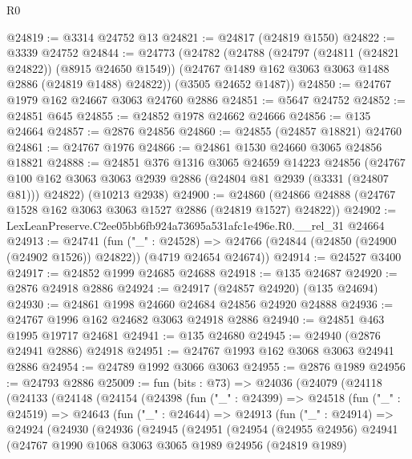 \begin{lexlean}{R0}
\begin{coremodule}
@24819 := @3314 @24752 @13
@24821 := @24817 (@24819 @1550)
@24822 := @3339 @24752
@24844 := @24773
    (@24782
      (@24788
        (@24797 (@24811 (@24821 @24822)) (@8915 @24650 @1549))
        (@24767 @1489 @162 @3063 @3063 @1488 @2886 (@24819 @1488) @24822))
      (@3505 @24652 @1487))
@24850 := @24767 @1979 @162 @24667 @3063 @24760 @2886
@24851 := @5647 @24752
@24852 := @24851 @645
@24855 := @24852 @1978 @24662 @24666
@24856 := @135 @24664
@24857 := @2876 @24856
@24860 := @24855 (@24857 @18821) @24760
@24861 := @24767 @1976
@24866 := @24861 @1530 @24660 @3065 @24856 @18821
@24888 := @24851
    @376
    @1316
    @3065
    @24659
    @14223
    @24856
    (@24767 @100 @162 @3063 @3063 @2939 @2886 (@24804 @81 @2939 (@3331 (@24807 @81))) @24822)
    (@10213 @2938)
@24900 := @24860 (@24866 @24888 (@24767 @1528 @162 @3063 @3063 @1527 @2886 (@24819 @1527) @24822))
@24902 := LexLeanPreserve.C2ee05bb6fb924a73695a531afc1e496e.R0.__rel_31 @24664
@24913 := @24741
    (fun ("_" : @24528) =>
    @24766 (@24844 (@24850 (@24900 (@24902 @1526)) @24822)) (@4719 @24654 @24674))
@24914 := @24527 @3400
@24917 := @24852 @1999 @24685 @24688
@24918 := @135 @24687
@24920 := @2876 @24918 @2886
@24924 := @24917 (@24857 @24920) (@135 @24694)
@24930 := @24861 @1998 @24660 @24684 @24856 @24920 @24888
@24936 := @24767 @1996 @162 @24682 @3063 @24918 @2886
@24940 := @24851 @463 @1995 @19717 @24681
@24941 := @135 @24680
@24945 := @24940 (@2876 @24941 @2886) @24918
@24951 := @24767 @1993 @162 @3068 @3063 @24941 @2886
@24954 := @24789 @1992 @3066 @3063
@24955 := @2876 @1989
@24956 := @24793 @2886
@25009 := fun (bits : @73) =>
  @24036
    (@24079
      (@24118
        (@24133
          (@24148
            (@24154
              (@24398
                (fun ("_" : @24399) =>
                @24518
                  (fun ("_" : @24519) =>
                  @24643
                    (fun ("_" : @24644) =>
                    @24913
                      (fun ("_" : @24914) =>
                      @24924
                        (@24930
                          (@24936
                            (@24945
                              (@24951
                                (@24954
                                  (@24955 @24956)
                                  @24941
                                  (@24767
                                    @1990
                                    @1068
                                    @3063
                                    @3065
                                    @1989
                                    @24956
                                    (@24819 @1989)

\end{coremodule}
\end{lexlean}
